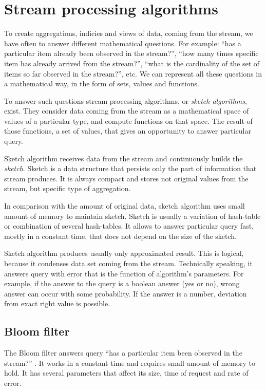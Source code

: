 \section{Stream processing algorithms}

To create aggregations, indicies and views of data, coming from the stream, we have often to answer different mathematical questions.
For example: ``has a particular item already been observed in the stream?'', ``how many times specific item has already arrived from the stream?'', ``what is the cardinality of the set of items so far observed in the stream?'', etc.
We can represent all these questions in a mathematical way, in the form of sets, values and functions.

To answer such questions stream processing algorithms, or \textit{sketch algorithms}, exist.
They consider data coming from the stream as a mathematical space of values of a particular type, and compute functions on that space.
The result of those functions, a set of values, that gives an opportunity to answer particular query.

Sketch algorithm receives data from the stream and continuously builds the \textit{sketch}.
Sketch is a data structure that persists only the part of information that stream produces.
It is always compact and stores not original values from the stream, but specific type of aggregation.

In comparison with the amount of original data, sketch algorithm uses small amount of memory to maintain sketch.
Sketch is usually a variation of hash-table or combination of several hash-tables.
It allows to answer particular query fast, mostly in a constant time, that does not depend on the size of the sketch.

Sketch algorithm produces usually only approximated result.
This is logical, because it condenses data set coming from the stream.
Technically speaking, it answers query with error that is the function of algorithm's parameters.
For example, if the answer to the query is a boolean answer (yes or no), wrong answer can occur with some probability.
If the answer is a number, deviation from exact right value is possible.

\subsection{Bloom filter}

The Bloom filter answers query ``has a particular item been observed in the stream?'' \cite{Cormode}.
It works in a constant time and requires small amount of memory to hold.
It has several parameters that affect its size, time of request and rate of error.

